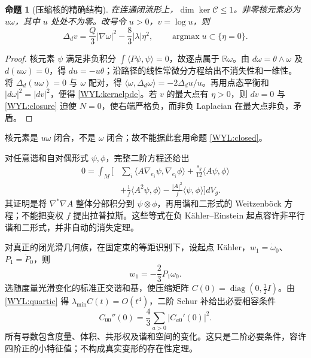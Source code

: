 \documentclass[UTF8,fontset=fandol,zihao=-4,oneside,openany]{ctexbook}
\theoremstyle{cjkplain}
\newtheorem{proposition}[theorem]{命题}
\numberwithin{equation}{chapter}
\begin{document}
\begin{proposition}[压缩核的精确结构]\label{WYL:kernel}
在连通闭流形上，$\dim\ker\mathcal C\le1$。非零核元素必为 $u\omega$，其中 $u$ 处处不为零。改号令 $u>0$，$v=\log u$，则
\begin{equation}\label{WYL:kernelpde}
\Delta_d v=\frac{Q}{3}|\nabla\omega|^2-\frac83|\lambda|\eta^2,
\qquad \operatorname{argmax}u\subset\{\eta=0\}.
\end{equation}
\end{proposition}
\begin{proof}
核元素 $\psi$ 满足非负积分 $\int\langle P\psi,\psi\rangle=0$，故逐点属于 $\mathbb R\omega$。由 $d\omega=\theta\wedge\omega$ 及 $d(u\omega)=0$，得 $du=-u\theta$；沿路径的线性常微分方程给出不消失性和一维性。
将 $\Delta_d(u\omega)=0$ 与 $\omega$ 配对，得
$\langle\omega,\Delta_d\omega\rangle=-2\Delta_d u/u$。再用点态平衡和 $|d\omega|^2=|dv|^2$，便得 \eqref{WYL:kernelpde}。若 $v$ 的最大点有 $\eta>0$，则 $dv=0$ 与 \eqref{WYL:closure} 迫使 $N=0$，使右端严格负，而非负 Laplacian 在最大点非负，矛盾。
\end{proof}
核元素是 $u\omega$ 闭合，不是 $\omega$ 闭合；故不能据此套用命题 \ref{WYL:closed}。

对任意谐和自对偶形式 $\psi,\phi$，完整二阶方程还给出
\begin{equation}\label{WYL:bilinear}
\begin{split}
0=\int_M\bigg[&\sum_i\langle A\nabla_{e_i}\psi,\nabla_{e_i}\phi\rangle
+\frac{s_g}{12}\langle A\psi,\phi\rangle\\
&+\frac1f\langle A^2\psi,\phi\rangle
-\frac{|A|^2}{f}\langle\psi,\phi\rangle\bigg]dV_g.
\end{split}
\end{equation}
其证明是将 $\nabla^*\nabla A$ 整体分部积分到 $\psi\otimes\phi$，再用谐和二形式的 Weitzenböck 方程；不能把变权 $f$ 提出拉普拉斯。这些等式在负 Kähler--Einstein 起点容许非平行谐和二形式，并非自动的消失定理。

对真正的闭光滑几何族，在固定束的等距识别下，设起点 Kähler，$w_1=\dot\omega_0$、$P_1=\dot P_0$，则
\[
w_1=-\frac23P_1\omega_0.
\]
选随度量光滑变化的标准正交谐和基，使压缩矩阵
$C(0)=\operatorname{diag}(0,\frac32I)$。由 \eqref{WYL:quartic} 得
$\lambda_{\min}C(t)=O(t^4)$，二阶 Schur 补给出必要相容条件
\begin{equation}\label{WYL:schur}
C_{00}''(0)=\frac43\sum_{a>0}|C_{a0}'(0)|^2.
\end{equation}
所有导数包含度量、体积、共形权及谐和空间的变化。这只是二阶必要条件，容许四阶正的小特征值；不构成真实变形的存在性定理。
\end{document}
